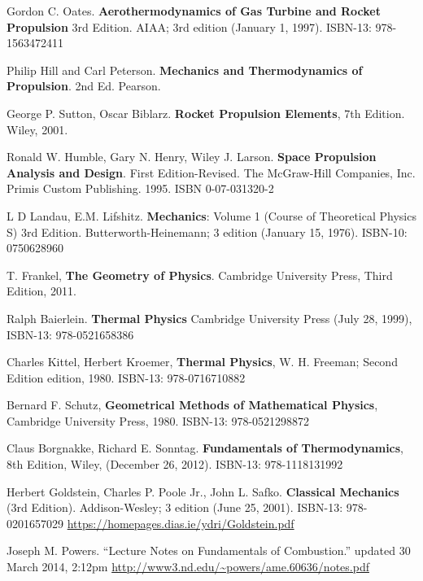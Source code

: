 \documentclass[10pt]{amsart}
\begin{document}
\begin{thebibliography}{9}

Gordon C. Oates. \textbf{Aerothermodynamics of Gas Turbine and Rocket Propulsion} 3rd Edition. AIAA; 3rd edition (January 1, 1997). ISBN-13: 978-1563472411

Philip Hill and Carl Peterson. \textbf{Mechanics and Thermodynamics of Propulsion}. 2nd Ed. Pearson.

George P. Sutton, Oscar Biblarz. \textbf{Rocket Propulsion Elements}, 7th Edition. Wiley, 2001.  

Ronald W. Humble, Gary N. Henry, Wiley J. Larson.  \textbf{Space Propulsion Analysis and Design}.  First Edition-Revised.  The McGraw-Hill Companies, Inc.  Primis Custom Publishing.  1995. ISBN 0-07-031320-2   

L D Landau, E.M. Lifshitz. \textbf{Mechanics}: Volume 1 (Course of Theoretical Physics S) 3rd Edition. Butterworth-Heinemann; 3 edition (January 15, 1976). ISBN-10: 0750628960

  
T. Frankel, \textbf{The Geometry of Physics}. Cambridge University Press, Third Edition, 2011.

Ralph Baierlein. \textbf{Thermal Physics} Cambridge University Press (July 28, 1999), ISBN-13: 978-0521658386

Charles Kittel, Herbert Kroemer, \textbf{Thermal Physics}, W. H. Freeman; Second Edition edition, 1980. 
ISBN-13: 978-0716710882

Bernard F. Schutz, \textbf{Geometrical Methods of Mathematical Physics}, Cambridge University Press, 1980.
ISBN-13: 978-0521298872

Claus Borgnakke, Richard E. Sonntag.  \textbf{Fundamentals of Thermodynamics}, 8th Edition, Wiley, (December 26, 2012). 
ISBN-13: 978-1118131992  

Herbert Goldstein, Charles P. Poole Jr., John L. Safko.  \textbf{Classical Mechanics} (3rd Edition). Addison-Wesley; 3 edition (June 25, 2001).  ISBN-13: 978-0201657029 \url{https://homepages.dias.ie/ydri/Goldstein.pdf}

Joseph M. Powers.  ``Lecture Notes on Fundamentals of Combustion.'' updated 30 March 2014, 2:12pm
\url{http://www3.nd.edu/~powers/ame.60636/notes.pdf}



\end{thebibliography}
\end{document}
